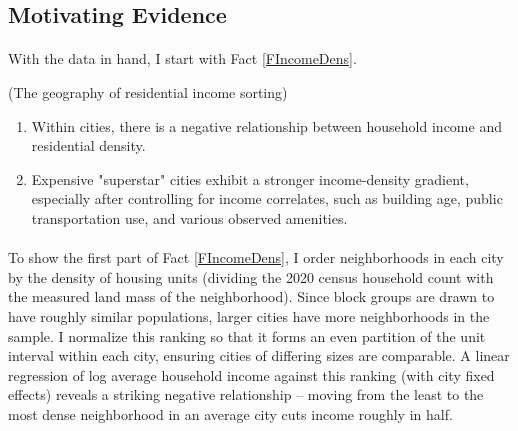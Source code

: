 \documentclass[11pt]{article}
\begin{document}
	 
	 \subsection{Motivating Evidence}
	 
 	\paragraph*{}
	 With the data in hand, I start with Fact \ref{FIncomeDens}. 

	\begin{Fact}\label{FIncomeDens}
		(The geography of residential income sorting)
		\begin{enumerate}
			\item Within cities, there is a negative relationship between household income and residential density. 
		
			\item Expensive "superstar" cities exhibit a stronger income-density gradient, especially after controlling for income correlates, such as building age, public transportation use, and various observed amenities.
		\end{enumerate}
	\end{Fact}

	\paragraph*{}
	To show the first part of Fact \ref{FIncomeDens}, I order neighborhoods in each city by the density of housing units (dividing the 2020 census household count with the measured land mass of the neighborhood). Since block groups are drawn to have roughly similar populations, larger cities have more neighborhoods in the sample. I normalize this ranking so that it forms an even partition of the unit interval within each city, ensuring cities of differing sizes are comparable. A linear regression of log average household income against this ranking (with city fixed effects) reveals a striking negative relationship -- moving from the least to the most dense neighborhood in an average city cuts income roughly in half. 
\end{document}
